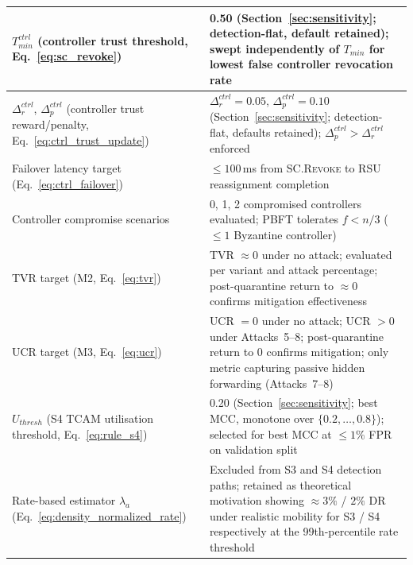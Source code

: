 \documentclass[12pt, a4paper]{report}
\begin{document}
{{\begin{longtable}{|m{5.0cm}|m{9.0cm}|}
    
             \hline
            $T_{min}^{ctrl}$ (controller trust threshold,
            Eq.~\ref{eq:sc_revoke}) &
            0.50 (Section~\ref{sec:sensitivity}; detection-flat, default retained); swept
            independently of $T_{min}$ for lowest false controller revocation rate \\
            \hline
            $\Delta_r^{ctrl}$, $\Delta_p^{ctrl}$
            (controller trust reward/penalty,
            Eq.~\ref{eq:ctrl_trust_update}) &
            $\Delta_r^{ctrl}=0.05$, $\Delta_p^{ctrl}=0.10$ (Section~\ref{sec:sensitivity}; detection-flat, defaults retained); $\Delta_p^{ctrl} >
            \Delta_r^{ctrl}$ enforced \\
            \hline
            Failover latency target
            (Eq.~\ref{eq:ctrl_failover}) &
            $\leq 100$\,ms from \textsc{SC.Revoke}
            to RSU reassignment completion \\
            \hline
            Controller compromise scenarios &
            0, 1, 2 compromised controllers evaluated;
            PBFT tolerates $f < n/3$ ($\leq 1$
            Byzantine controller) \\
             \hline
           TVR target (M2, Eq.~\ref{eq:tvr}) &
            TVR $\approx 0$ under no attack;
            evaluated per variant and attack percentage;
            post-quarantine return to $\approx 0$
            confirms mitigation effectiveness \\

          \hline
          UCR target (M3, Eq.~\ref{eq:ucr}) &
            UCR $= 0$ under no attack;
            UCR $> 0$ under Attacks~5--8;
            post-quarantine return to 0 confirms
            mitigation; only metric capturing passive
            hidden forwarding (Attacks~7--8) \\
        
  \hline
  $U_{thresh}$ (S4 TCAM utilisation threshold,
  Eq.~\ref{eq:rule_s4}) &
  0.20 (Section~\ref{sec:sensitivity}; best \ac{MCC}, monotone over $\{0.2,\dots,0.8\}$); selected for
  best MCC at $\leq 1\%$ FPR on validation split \\
  \hline
  Rate-based estimator $\hat{\lambda}_a$
  (Eq.~\ref{eq:density_normalized_rate}) &
  Excluded from S3 and S4 detection paths;
  retained as theoretical motivation showing
  $\approx 3\%$ / $2\%$ DR under realistic mobility
  for S3 / S4 respectively at the 99th-percentile
  rate threshold \\

\end{longtable}

}}
\end{document}
